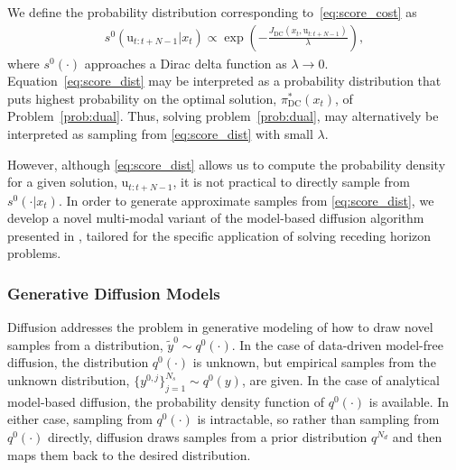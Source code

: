 \documentclass[letterpaper, 10 pt, conference]{IEEEconf}
\begin{document}
We define the probability distribution corresponding to~\eqref{eq:score_cost} as
\begin{align} \label{eq:score_dist}
    s^{0}(\mathrm{u}_{t:t+N-1} | x_{t}) \propto \exp{\left(-\frac{J_{\text{DC}}(x_t, \mathrm{u}_{t:t+N-1})}{\lambda} \right)},
\end{align}
where $s^{0}(\cdot)$ approaches a Dirac delta function as $\lambda \rightarrow 0$.
% 
Equation~\eqref{eq:score_dist} may be interpreted as a probability distribution that puts highest probability on the optimal solution, $\pi_{\mathrm{DC}}^{\ast}(x_{t})$, of Problem~\eqref{prob:dual}.
Thus, solving problem~\eqref{prob:dual}, may alternatively be interpreted as sampling from \eqref{eq:score_dist} with small $\lambda$.

However, although \eqref{eq:score_dist} allows us to compute the probability density for a given solution, $\mathrm{u}_{t:t+N-1}$, it is not practical to directly sample from $s^0(\cdot | x_{t})$.
In order to generate approximate samples from \eqref{eq:score_dist}, we develop a novel multi-modal variant of the model-based diffusion algorithm presented in \cite{pan2024model}, tailored for the specific application of solving receding horizon problems.

\subsubsection{Generative Diffusion Models}
Diffusion addresses the problem in generative modeling of how to draw novel samples from a  distribution, $\tilde{y}^{0} \sim q^{0}(\cdot)$.
In the case of data-driven model-free diffusion, the distribution $q^{0}(\cdot)$ is unknown, but empirical samples from the unknown distribution, $\{y^{0, j}\}_{j=1}^{N_s} \sim q^{0}(y)$, are given.
In the case of analytical model-based diffusion, the probability density function of $q^{0}(\cdot)$ is available.
In either case, sampling from $q^{0}(\cdot)$ is intractable, so rather than sampling from $q^{0}(\cdot)$ directly, diffusion draws samples from a prior distribution $q^{N_d}$ and then maps them back to the desired distribution.
\end{document}
